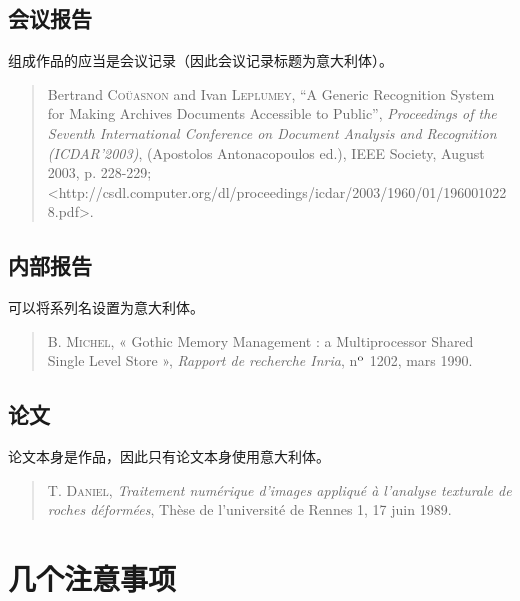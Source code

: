 \subsection{会议报告}

组成作品的应当是会议记录（因此会议记录标题为意大利体）。

\begin{quote}
    Bertrand \textsc{Coüasnon} and Ivan \textsc{Leplumey}, ``A Generic Recognition System for Making Archives Documents Accessible to Public'', \emph{Proceedings of the Seventh International Conference on Document Analysis and Recognition (ICDAR'2003)}, (Apostolos Antonacopoulos ed.), IEEE Society, August 2003, p. 228-229; <http://csdl.computer.org/dl/proceedings/icdar/2003/1960/01/\linebreak1960010228.pdf>.
\end{quote}

\subsection{内部报告}

可以将系列名设置为意大利体。

\begin{quote}
    B. \textsc{Michel}, « Gothic Memory Management : a Multiprocessor Shared Single Level Store », \emph{Rapport de recherche Inria}, n$^{\rm o}$ 1202, mars 1990.
\end{quote}

\subsection{论文}

论文本身是作品，因此只有论文本身使用意大利体。

\begin{quote}
    T. \textsc{Daniel}, \emph{Traitement numérique d'images appliqué à l'analyse texturale de roches déformées}, Thèse de l'université de Rennes 1, 17 juin 1989.
\end{quote}

\section{几个注意事项}

